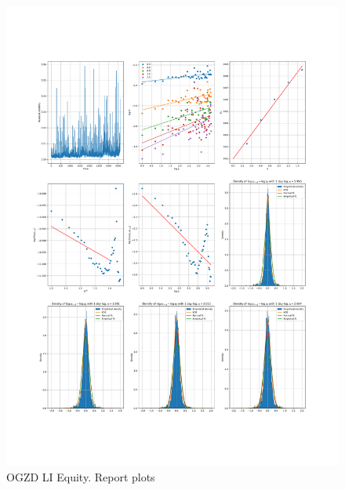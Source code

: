     \begin{figure}[h]
        \centering
        \includegraphics[width=\textwidth]{fig/OGZD LI Equity.pdf}
        \caption{OGZD LI Equity. Report plots}
    \end{figure} 
        

